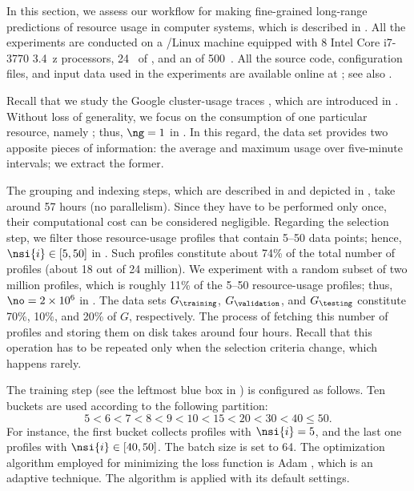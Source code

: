 In this section, we assess our workflow for making fine-grained long-range
predictions of resource usage in computer systems, which is described in
. All the experiments are conducted on a /Linux
machine equipped with 8 Intel Core i7-3770 3.4~z processors, 24~
of , and an  of 500~. All the source code, configuration
files, and input data used in the experiments are available online at
\cite{eslab2017b}; see also \cite{eslab2017c}.


Recall that we study the Google cluster-usage traces \cite{reiss2011}, which are
introduced in . Without loss of generality, we focus
on the consumption of one particular resource, namely ; thus, $\ng = 1$
in . In this regard, the data set provides two apposite
pieces of information: the average and maximum  usage over five-minute
intervals; we extract the former.

The grouping and indexing steps, which are described in
 and depicted in , take around 57
hours (no parallelism). Since they have to be performed only once, their
computational cost can be considered negligible. Regarding the selection step,
we filter those resource-usage profiles that contain 5--50 data points; hence,
$\nsi{i} \in [5, 50]$ in . Such profiles constitute about
74\% of the total number of profiles (about 18 out of 24 million). We experiment
with a random subset of two million profiles, which is roughly 11\% of the 5--50
resource-usage profiles; thus, $\no = 2 \times 10^6$ in .
The data sets $G_\training$, $G_\validation$, and $G_\testing$ constitute 70\%,
10\%, and 20\% of $G$, respectively. The process of fetching this number of
profiles and storing them on disk takes around four hours. Recall that this
operation has to be repeated only when the selection criteria change, which
happens rarely.


The training step (see the leftmost blue box in ) is
configured as follows. Ten buckets are used according to the following
partition:
\[
  5 < 6 < 7 < 8 < 9 < 10 < 15 < 20 < 30 < 40 \leq 50.
\]
For instance, the first bucket collects profiles with $\nsi{i} = 5$, and the
last one profiles with $\nsi{i} \in [40, 50]$. The batch size \nb is set to 64.
The optimization algorithm employed for minimizing the loss function is Adam
\cite{kingma2014}, which is an adaptive technique. The algorithm is applied with
its default settings.

